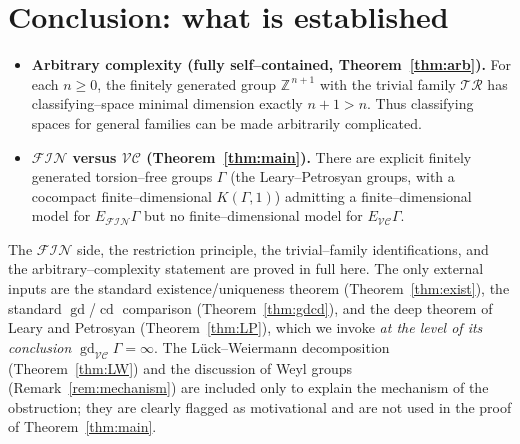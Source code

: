 \documentclass{amsart}
\theoremstyle{definition}
\newcommand{\Z}{\mathbb{Z}}
\newcommand{\FIN}{\mathcal{F\!I\!N}}
\newcommand{\VC}{\mathcal{V\!C}}
\newcommand{\gd}{\operatorname{gd}}
\newcommand{\cd}{\operatorname{cd}}
\begin{document}
\section{Conclusion: what is established}

\begin{itemize}
\item \textbf{Arbitrary complexity (fully self--contained, Theorem~\ref{thm:arb}).} For each
$n\ge 0$, the finitely generated group $\Z^{\,n+1}$ with the trivial family $\mathcal{TR}$ has
classifying--space minimal dimension exactly $n+1>n$. Thus classifying spaces for general
families can be made arbitrarily complicated.

\item \textbf{$\FIN$ versus $\VC$ (Theorem~\ref{thm:main}).} There are explicit finitely
generated torsion--free groups $\Gamma$ (the Leary--Petrosyan groups, with a cocompact
finite--dimensional $K(\Gamma,1)$) admitting a finite--dimensional model for $E_{\FIN}\Gamma$ but no
finite--dimensional model for $E_{\VC}\Gamma$.
\end{itemize}

The $\FIN$ side, the restriction principle, the trivial--family identifications, and the
arbitrary--complexity statement are proved in full here. The only external inputs are the
standard existence/uniqueness theorem (Theorem~\ref{thm:exist}), the standard
$\gd$/$\cd$ comparison (Theorem~\ref{thm:gdcd}), and the deep theorem of Leary and Petrosyan
(Theorem~\ref{thm:LP}), which we invoke \emph{at the level of its conclusion}
$\gd_{\VC}\Gamma=\infty$. The Lück--Weiermann decomposition (Theorem~\ref{thm:LW}) and the
discussion of Weyl groups (Remark~\ref{rem:mechanism}) are included only to explain the
mechanism of the obstruction; they are clearly flagged as motivational and are not used in the
proof of Theorem~\ref{thm:main}.
\end{document}
